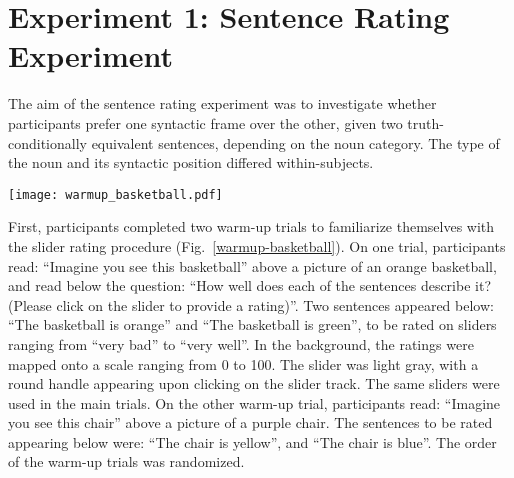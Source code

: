 \section{Experiment 1: Sentence Rating Experiment}


The aim of the sentence rating experiment was to investigate whether participants prefer one syntactic frame over the other, given two truth-conditionally equivalent sentences, depending on the noun category. The type of the noun and its syntactic position differed within-subjects.

\begin{figure*}[t]
	\begin{center}
		\texttt{[image: warmup\_basketball.pdf]}
	\end{center}
	\caption{Example view of the sentence rating warm-up trial wherein participants rated sentences about a depicted basketball. }
	\label{warmup-basketball}
\end{figure*}
First, participants completed two warm-up trials to familiarize themselves with the slider rating procedure (Fig.~\ref{warmup-basketball}). On one trial, participants read: “Imagine you see this basketball” above a picture of an orange basketball, and read below the question: “How well does each of the sentences describe it? (Please click on the slider to provide a rating)”. Two sentences appeared below: “The basketball is orange” and “The basketball is green”, to be rated on sliders ranging from “very bad” to “very well”. In the background, the ratings were mapped onto a scale ranging from 0 to 100. The slider was light gray, with a round handle appearing upon clicking on the slider track. The same sliders were used in the main trials. On the other warm-up trial, participants read: “Imagine you see this chair” above a picture of a purple chair. The sentences to be rated appearing below were: “The chair is yellow”, and “The chair is blue”. The order of the warm-up trials was randomized.    

